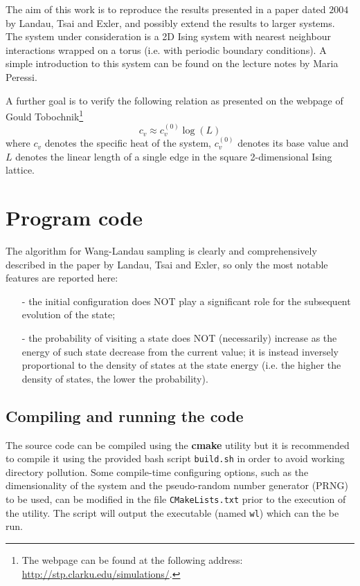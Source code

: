 \documentclass[11pt]{article}
\begin{document}
The aim of this work is to reproduce the results presented in a paper dated $2004$ by Landau, Tsai and Exler\cite{bib:wang_landau}, and possibly extend the results to larger systems. The system under consideration is a 2D Ising system with nearest neighbour interactions wrapped on a torus (i.e. with periodic boundary conditions). A simple introduction to this system can be found on the lecture notes by Maria Peressi\cite{bib:lect_notes}.

A further goal is to verify the following relation as presented on the webpage of Gould Tobochnik\cite{bib:problem}\footnote{The webpage can be found at the following address: \url{http://stp.clarku.edu/simulations/}.}
\[
	c_v \approx c_v^(0)\log{(L)}
\]
where $c_v$ denotes the specific heat of the system, $c_v^(0)$ denotes its base value and $L$ denotes the linear length of a single edge in the square 2-dimensional Ising lattice.

\section*{Program code}

The algorithm for Wang-Landau sampling is clearly and comprehensively described in the paper by Landau, Tsai and Exler\cite{bib:wang_landau}, so only the most notable features are reported here:
\begin{itemize}
	\item[-] the initial configuration does NOT play a significant role for the subsequent evolution of the state;
	\item[-] the probability of visiting a state does NOT (necessarily) increase as the energy of such state decrease from the current value; it is instead inversely proportional to the density of states at the state energy (i.e. the higher the density of states, the lower the probability).
	
\end{itemize}


\subsection*{Compiling and running the code}

The source code can be compiled using the {\bf cmake} utility but it is recommended to compile it using the provided bash script \verb|build.sh| in order to avoid working directory pollution.
Some compile-time configuring options, such as the dimensionality of the system and the pseudo-random number generator (PRNG) to be used, can be modified in the file \verb|CMakeLists.txt| prior to the execution of the utility.
The script will output the executable (named \verb|wl|) which can the be run.
\end{document}

